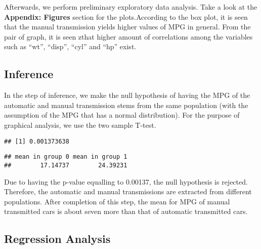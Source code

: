 \documentclass[]{article}
\newenvironment{Shaded}{\begin{snugshade}}{\end{snugshade}}
\newcommand{\KeywordTok}[1]{\textcolor[rgb]{0.13,0.29,0.53}{\textbf{#1}}}
\newcommand{\StringTok}[1]{\textcolor[rgb]{0.31,0.60,0.02}{#1}}
\newcommand{\OperatorTok}[1]{\textcolor[rgb]{0.81,0.36,0.00}{\textbf{#1}}}
\newcommand{\NormalTok}[1]{#1}
\begin{document}
Afterwards, we perform preliminary exploratory data analysis. Take a
look at the \textbf{Appendix: Figures} section for the plots.According
to the box plot, it is seen that the manual transmission yields higher
values of MPG in general. From the pair of graph, it is seen zthat
higher amount of correlations among the variables such as ``wt'',
``disp'', ``cyl'' and ``hp'' exist.

\subsection{Inference}\label{inference}

In the step of inference, we make the null hypothesis of having the MPG
of the automatic and manual transmission stems from the same population
(with the assumption of the MPG that has a normal distribution). For the
purpose of graphical analysis, we use the two sample T-test.

\begin{Shaded}
\end{Shaded}

\begin{verbatim}
## [1] 0.001373638
\end{verbatim}

\begin{Shaded}
\end{Shaded}

\begin{verbatim}
## mean in group 0 mean in group 1 
##        17.14737        24.39231
\end{verbatim}

Due to having the p-value equalling to 0.00137, the null hypothesis is
rejected. Therefore, the automatic and manual transmissions are
extracted from different populations. After completion of this step, the
mean for MPG of manual transmitted cars is about seven more than that of
automatic transmitted cars.

\subsection{Regression Analysis}\label{regression-analysis}
\end{document}
